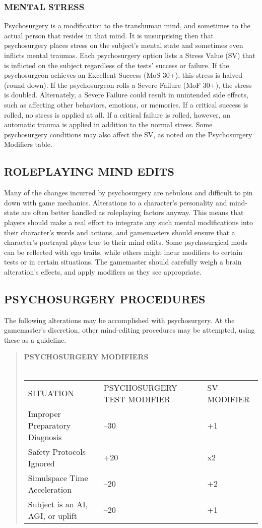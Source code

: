 \subsubsection{MENTAL STRESS}
Psychosurgery is a modification to the transhuman
mind, and sometimes to the actual person that resides
in that mind. It is unsurprising then that psychosurgery
places stress on the subject’s mental state and
sometimes even inflicts mental traumas.
Each psychosurgery option lists a Stress Value
(SV) that is inflicted on the subject regardless of
the tests’ success or failure. If the psychosurgeon
achieves an Excellent Success (MoS 30+), this stress
is halved (round down). If the psychosurgeon rolls
a Severe Failure (MoF 30+), the stress is doubled.
Alternately, a Severe Failure could result in unintended
side effects, such as affecting other behaviors,
emotions, or memories.
If a critical success is rolled, no stress is applied at
all. If a critical failure is rolled, however, an automatic
trauma is applied in addition to the normal stress.
Some psychosurgery conditions may also affect the
SV, as noted on the Psychosurgery Modifiers table.


\subsection{ROLEPLAYING MIND EDITS}
Many of the changes incurred by psychosurgery are
nebulous and difficult to pin down with game mechanics.
Alterations to a character’s personality and
mind-state are often better handled as roleplaying factors
anyway. This means that players should make a
real effort to integrate any such mental modifications
into their character’s words and actions, and gamemasters
should ensure that a character’s portrayal
plays true to their mind edits. Some psychosurgical
mods can be reflected with ego traits, while others
might incur modifiers to certain tests or in certain
situations. The gamemaster should carefully weigh a
brain alteration’s effects, and apply modifiers as they
see appropriate.


\subsection{PSYCHOSURGERY PROCEDURES}
The following alterations may be accomplished with
psychosurgery. At the gamemaster’s discretion, other
mind-editing procedures may be attempted, using
these as a guideline.

\begin{quotation}
\textbf{PSYCHOSURGERY MODIFIERS}
\\
\\
\begin{tabular}{lll}
SITUATION & PSYCHOSURGERY TEST MODIFIER & SV MODIFIER \\
Improper Preparatory Diagnosis & –30 & +1 \\
Safety Protocols Ignored & +20 & x2 \\
Simulspace Time Acceleration & –20 & +2 \\
Subject is an AI, AGI, or uplift & –20 & +1 \\
\end{tabular} 
\end{quotation}

